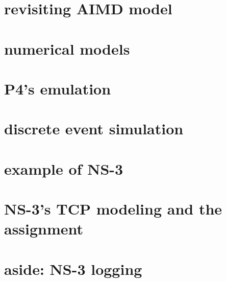 




\section{revisiting AIMD model}



\section{numerical models}



\section{P4's emulation}


\section{discrete event simulation}


\section{example of NS-3}


\section{NS-3's TCP modeling and the assignment}


\section{aside: NS-3 logging}

